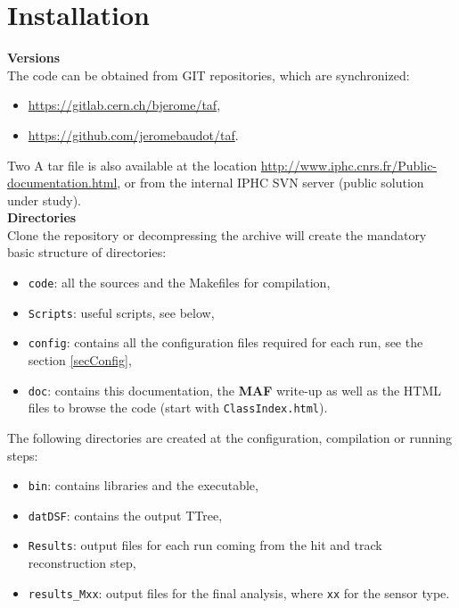 \documentclass[a4paper, 12pt, twoside]{article}
\newcommand{\MAF}{{\bf MAF }}
\begin{document}
\vspace{2cm}

\section{Installation}
\label{secInstall}

\noindent
{\bf Versions}\\
\noindent
The code can be obtained from GIT repositories, which are synchronized:
\begin{itemize}
\item \url{https://gitlab.cern.ch/bjerome/taf},
\item \url{https://github.com/jeromebaudot/taf}.
\end{itemize}
Two A tar file is also available at the location \url{http://www.iphc.cnrs.fr/Public-documentation.html}, or from the internal IPHC SVN server (public solution under study).\\ 


\noindent
{\bf Directories}\\
\noindent
Clone the repository or decompressing the archive will create the mandatory basic structure of directories:
\begin{itemize}
\item {\tt code}: all the sources and the Makefiles for compilation,
\item {\tt Scripts}: useful scripts, see below,
\item {\tt config}: contains all the configuration files required for each run, see the section \ref{secConfig},
\item {\tt doc}: contains this documentation, the \MAF  write-up as well as the HTML files to browse the code (start with {\tt ClassIndex.html}).
\end{itemize}
The following directories are created at the configuration, compilation or running steps:
\begin{itemize}
\item {\tt bin}: contains libraries and the executable,
\item {\tt datDSF}: contains the output TTree,
\item {\tt Results}: output files for each run coming from the hit and track reconstruction step,
\item {\tt results\_Mxx}: output files for the final analysis, where {\tt xx} for the sensor type.
\end{itemize}
\end{document}
